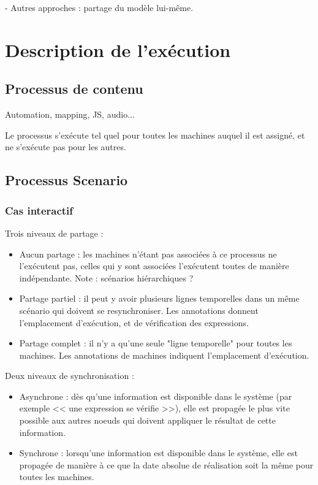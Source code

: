 \documentclass{article}
\begin{document}
- Autres approches : partage du modèle lui-même.

\section{Description de l'exécution}
\subsection{Processus de contenu}
Automation, mapping, JS, audio...

Le processus s'exécute tel quel pour toutes les machines auquel il est assigné, 
et ne s'exécute pas pour les autres.

\subsection{Processus Scenario}
\subsubsection{Cas interactif}
Trois niveaux de partage : 

\begin{itemize}
    \item Aucun partage : les machines n'étant pas associées à ce processus ne l'exécutent pas, celles qui y sont associées l'exécutent toutes de manière indépendante. Note : scénarios hiérarchiques ? 
    \item Partage partiel : il peut y avoir plusieurs lignes temporelles dans un même scénario qui doivent se resynchroniser. Les annotations donnent l'emplacement d'exécution, et de vérification des expressions.
    \item Partage complet : il n'y a qu'une seule "ligne temporelle" pour toutes les machines. Les annotations de machines indiquent l'emplacement d'exécution.
\end{itemize}

Deux niveaux de synchronisation : 
\begin{itemize}
    \item Asynchrone : dès qu'une information est disponible dans le système (par exemple << une expression se vérifie >>), elle est propagée le plus vite possible aux autres noeuds qui doivent appliquer le résultat de cette information.
    \item Synchrone : lorsqu'une information est disponible dans le système, elle est propagée de manière à ce que la date absolue de réalisation soit la même pour toutes les machines.
\end{itemize}
\end{document}
